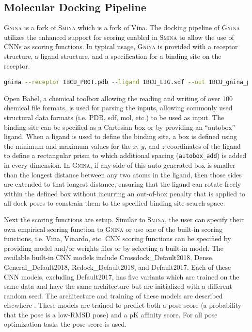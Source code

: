 \documentclass[journal=jcisd8,manuscript=article]{achemso}
\begin{document}
\subsection{Molecular Docking Pipeline}
\textsc{\textsc{Gnina}} is a fork of \textsc{Smina}\cite{koes2013lessons} which is a fork of Vina\cite{trott2010autodock}. The docking pipeline of \textsc{\textsc{Gnina}} utilizes the enhanced support for scoring enabled in \textsc{Smina} to allow the use of CNNs as scoring functions. In typical usage, \textsc{\textsc{Gnina}} is provided with a receptor structure, a ligand structure, and a specification for a binding site on the receptor.
\begin{lstlisting}[title=Gnina Usage,label=code:Usage,language=bash]
    gnina --receptor 1BCU_PROT.pdb --ligand 1BCU_LIG.sdf --out 1BCU_gnina_poses.sdf.gz --autobox_ligand 1BCU_LIG.sdf --autobox_add 4 --cnn Crossdock_Default2018 Dense_3 --cnn_scoring rescore --exhaustiveness 8 --num_mc_saved 50 --cnn_rotation 0 --num_modes 9 --min_rmsd_filter 1
\end{lstlisting}
Open Babel\cite{o2011open,babelopen}, a chemical toolbox allowing the reading and writing of over 100 chemical file formats, is used for parsing the inputs, allowing commonly used structural data formats (i.e. PDB, sdf, mol, etc.) to be used as input. The binding site can be specified as a Cartesian box or by providing an ``autobox'' ligand.  When a ligand is used to define the binding site, a box is defined using the minimum and maximum values for the $x$, $y$, and $z$ coordinates of the ligand to define a rectangular prism to which additional spacing (\texttt{autobox\_add}) is added in every dimension. In \textsc{Gnina}, if any side of this auto-generated box is smaller than the longest distance between any two atoms in the ligand, then those sides are extended to that longest distance, ensuring that the ligand can rotate freely within the defined box without incurring an out-of-box penalty that is applied to all dock poses to constrain them to the specified binding site search space.

Next the scoring functions are setup. Similar to \textsc{Smina}, the user can specify their own empirical scoring function to \textsc{Gnina} or use one of the built-in scoring functions, i.e. Vina, Vinardo\cite{quiroga2016vinardo}, etc. CNN scoring functions can be specified by providing model and/or weights files or by selecting a built-in model.  The available built-in CNN models include Crossdock\_Default2018, Dense, General\_Default2018, Redock\_Default2018, and Default2017. Each of these CNN models, excluding Default2017, has five variants which are trained on the same data and have the same architecture but are initialized with a different random seed. The architecture and training of these models are described elsewhere \cite{francoeur2020three,Ragoza2017}. These models are trained to predict both a pose score (a probability that the pose is a low-RMSD pose) and a pK affinity score.  For all pose optimization tasks the pose score is used.
\end{document}
